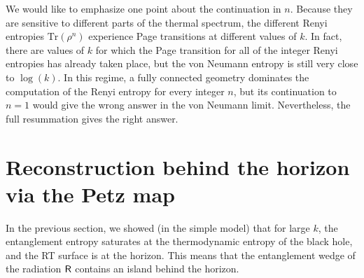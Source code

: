 \documentclass[12pt]{article}
\newcommand{\be}{\begin{equation}}
\newcommand{\ee}{\end{equation}}
\numberwithin{equation}{section}
\def\tr{\text{Tr}}
\begin{document}
We would like to emphasize one point about the continuation in $n$. Because they are sensitive to different parts of the thermal spectrum, the different Renyi entropies $\tr(\rho^n)$ experience Page transitions at different values of $k$. In fact, there are values of $k$ for which the Page transition for all of the integer Renyi entropies has already taken place, but the von Neumann entropy is still very close to $\log(k)$. In this regime, a fully connected geometry dominates the computation of the Renyi entropy for every integer $n$, but its continuation to $n = 1$ would give the wrong answer in the von Neumann limit. Nevertheless, the full resummation gives the right answer.








\section{Reconstruction behind the horizon via the Petz map}\label{sec:petz}
In the previous section, we showed (in the simple model) that for large $k$, the entanglement entropy saturates at the thermodynamic entropy of the black hole, and the RT surface is at the horizon. This means that the entanglement wedge of the radiation $\sf{R}$ contains an island behind the horizon.
\end{document}
